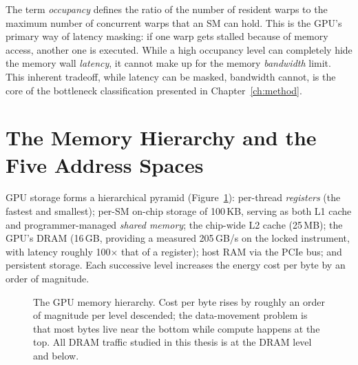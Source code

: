 The term \emph{occupancy} defines the ratio of the number of resident warps to the maximum number of concurrent warps that an SM can hold. This is the GPU's primary way of latency masking: if one warp gets stalled because of memory access, another one is executed. While a high occupancy level can completely hide the memory wall \emph{latency}, it cannot make up for the memory \emph{bandwidth} limit. This inherent tradeoff, while latency can be masked, bandwidth cannot, is the core of the bottleneck classification presented in Chapter~\ref{ch:method}.

\section{The Memory Hierarchy and the Five Address Spaces}\label{sec:bg-mem}

GPU storage forms a hierarchical pyramid (Figure~\ref{fig:memhier}): per-thread \emph{registers} (the fastest and smallest); per-SM on-chip storage of 100\,KB, serving as both L1 cache and programmer-managed \emph{shared memory}; the chip-wide L2 cache (25\,MB); the GPU's DRAM (16\,GB, providing a measured 205\,GB/s on the locked instrument, with latency roughly 100$\times$ that of a register); host RAM via the PCIe bus; and persistent storage. Each successive level increases the energy cost per byte by an order of magnitude.

\begin{figure}[t]
\centering
{}
\caption[The GPU memory hierarchy.]{The GPU memory hierarchy. Cost per byte rises
by roughly an order of magnitude per level descended; the data-movement problem is
that most bytes live near the bottom while compute happens at the top. All DRAM
traffic studied in this thesis is at the DRAM level and below.}
\label{fig:memhier}
\end{figure}

